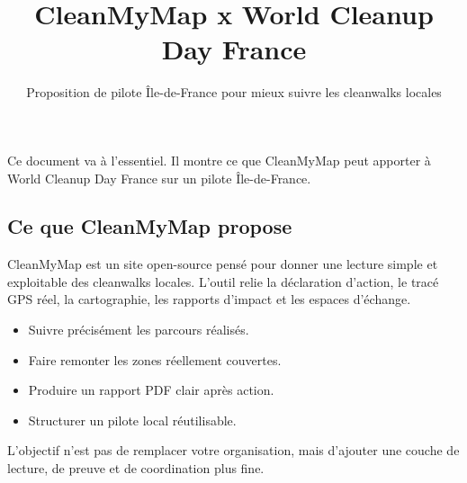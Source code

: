 \documentclass[
  french,
  10pt,
  a4paper,
  oneside]{article}
\title{CleanMyMap x World Cleanup Day France}
\subtitle{Proposition de pilote Île-de-France pour mieux suivre les
cleanwalks locales}
\author{}
\date{}
\providecommand{\tightlist}{%
\setlength{\itemsep}{0pt}\setlength{\parskip}{0pt}}
\begin{document}
\maketitle


\begin{tcolorbox}[enhanced jigsaw, arc=.35mm, bottomrule=.15mm, bottomtitle=1mm, breakable, colback=white, colbacktitle=quarto-callout-note-color!10!white, colframe=quarto-callout-note-color-frame, coltitle=black, left=2mm, leftrule=.75mm, opacityback=0, opacitybacktitle=0.6, rightrule=.15mm, title=\textcolor{quarto-callout-note-color}{\faInfo}\hspace{0.5em}{Note}, titlerule=0mm, toprule=.15mm, toptitle=1mm]

Ce document va à l'essentiel. Il montre ce que CleanMyMap peut apporter
à World Cleanup Day France sur un pilote Île-de-France.

\end{tcolorbox}

\subsection{Ce que CleanMyMap propose}\label{ce-que-cleanmymap-propose}

CleanMyMap est un site open-source pensé pour donner une lecture simple
et exploitable des cleanwalks locales. L'outil relie la déclaration
d'action, le tracé GPS réel, la cartographie, les rapports d'impact et
les espaces d'échange.

\begin{itemize}
\tightlist
\item
  Suivre précisément les parcours réalisés.
\item
  Faire remonter les zones réellement couvertes.
\item
  Produire un rapport PDF clair après action.
\item
  Structurer un pilote local réutilisable.
\end{itemize}

\begin{tcolorbox}[enhanced jigsaw, arc=.35mm, bottomrule=.15mm, bottomtitle=1mm, breakable, colback=white, colbacktitle=quarto-callout-tip-color!10!white, colframe=quarto-callout-tip-color-frame, coltitle=black, left=2mm, leftrule=.75mm, opacityback=0, opacitybacktitle=0.6, rightrule=.15mm, title=\textcolor{quarto-callout-tip-color}{\faLightbulb}\hspace{0.5em}{Astuce}, titlerule=0mm, toprule=.15mm, toptitle=1mm]

L'objectif n'est pas de remplacer votre organisation, mais d'ajouter une
couche de lecture, de preuve et de coordination plus fine.

\end{tcolorbox}
\end{document}
